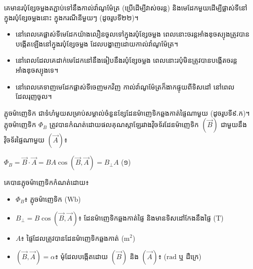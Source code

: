 \vspace{0.7em}

\noindent
\begin{minipage}[t]{0.55\textwidth}
	\raggedright
	គេមានរបុំខ្សែចម្លងតភ្ជាប់ទៅនឹងកាល់វ៉ាណូម៉ែត្រ (ប្រើដើម្បីវាស់ចរន្ត) និងមេដែកមួយដើម្បីផ្លាស់ទីនៅក្នុងរបុំខ្សែចម្លងនោះ ក្នុងករណីនីមួយៗ (ដូចរូបទី២២)។

	\begin{itemize}
		\item នៅពេលគេផ្លាស់ទីមេដែកយ៉ាងលឿនចូលទៅក្នុងរបុំខ្សែចម្លង ពេលនោះចរន្តអាំងឌុចស្យុងត្រូវបានបង្កើតឡើងនៅក្នុងរបុំខ្សែចម្លង ដែលបង្ហាញដោយកាល់វ៉ាណូម៉ែត្រ។
		\item នៅពេលដែលគេដាក់មេដែកនៅនឹងធៀបនឹងរបុំខ្សែចម្លង ពេលនោះរបុំមិនត្រូវបានបង្កើតចរន្តអាំងឌុចស្យុងទេ។
		\item នៅពេលគេទាញមេដែកផ្លាស់ទីចេញមកវិញ កាល់វ៉ាណូម៉ែត្រក៏ងាកផ្ទុយពីទិសដៅ នៅពេលដែលរុញចូល។
	\end{itemize}
\end{minipage}%
\hfill
\begin{minipage}[t]{0.40\textwidth}
	\vspace{0pt}
\end{minipage}


\vspace{0.7em}
\noindent
ភ្លុចម៉ាញេទិក ជាទំហំមួយសម្រាប់សម្គាល់ចំនួនខ្សែដែនម៉ាញេទិកឆ្លងកាត់ផ្ទៃណាមួយ (ដូចរូបទី៩.ក)។ ភ្លុចម៉ាញេទិក $\Phi_B$ ត្រូវបានកំណត់ដោយផលគុណស្កាឡែរវាងវ៉ិចទ័រដែនម៉ាញេទិក $(\vec{B})$ ជាមួយនឹងវ៉ិចទ័រផ្ទៃណាមួយ $(\vec{A})$៖

\begin{center}
	$\boxed{\Phi_B = \vec{B} \cdot \vec{A} = BA\cos(\vec{B}, \vec{A}) = B_\perp A}$ \quad (១)
\end{center}

\noindent
គេបានភ្លុចម៉ាញេទិកកំណត់ដោយ៖

\begin{itemize}[itemsep=2pt, topsep=4pt, parsep=0pt, leftmargin=1.6em]
	\item $\Phi_B$៖ ភ្លុចម៉ាញេទិក ($\mathrm{Wb}$)
	\item $B_\perp = B\cos(\vec{B}, \vec{A})$៖ ដែនម៉ាញេទិកឆ្លងកាត់ផ្ទៃ និងមានទិសដៅកែងនឹងផ្ទៃ ($\mathrm{T}$)
	\item $A$៖ ផ្ទៃដែលត្រូវបានដែនម៉ាញេទិកឆ្លងកាត់ ($\mathrm{m}^2$)
	\item $(\vec{B}, \vec{A}) = \alpha$៖ មុំដែលបង្កើតដោយ $(\vec{B})$ និង $(\vec{A})$៖ ($\mathrm{rad}$ ឬ ដឺក្រេ)
\end{itemize}

